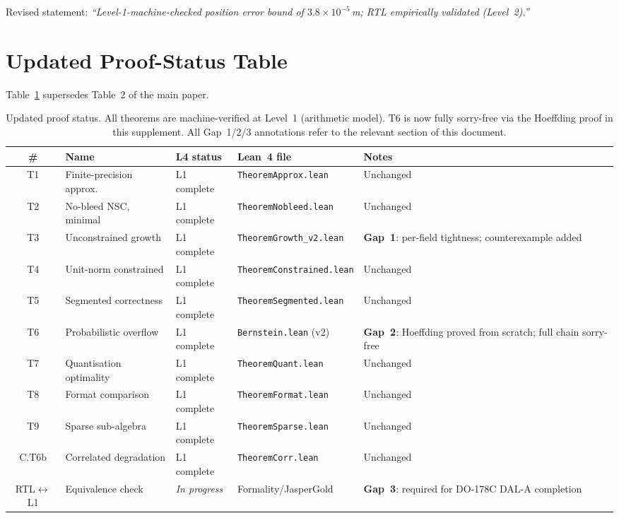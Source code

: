 \documentclass[11pt,a4paper]{article}
\theoremstyle{definition}
\theoremstyle{plain}
\theoremstyle{remark}
\begin{document}
Revised statement: \emph{``Level-1-machine-checked position error bound of
$3.8\times10^{-5}$\,m; RTL empirically validated (Level~2).''}

\section{Updated Proof-Status Table}
\label{sec:proof-table}

Table~\ref{tab:proof-status-rev} supersedes Table~2 of the main paper.

\begin{table}[h]
\centering
\caption{Updated proof status.
All theorems are machine-verified at Level~1 (arithmetic model).
T6 is now fully sorry-free via the Hoeffding proof in this supplement.
All Gap~1/2/3 annotations refer to the relevant section of this document.}
\label{tab:proof-status-rev}
\small
\begin{tabular}{clllp{3.2cm}}
\toprule
\# & Name & L4 status & Lean~4 file & Notes \\
\midrule
T1 & Finite-precision approx. & L1 complete & \texttt{TheoremApprox.lean} & Unchanged \\
T2 & No-bleed NSC, minimal & L1 complete & \texttt{TheoremNobleed.lean} & Unchanged \\
T3 & Unconstrained growth & L1 complete & \texttt{TheoremGrowth\_v2.lean} &
  \textbf{Gap~1}: per-field tightness; counterexample added \\
T4 & Unit-norm constrained & L1 complete & \texttt{TheoremConstrained.lean} & Unchanged \\
T5 & Segmented correctness & L1 complete & \texttt{TheoremSegmented.lean} & Unchanged \\
T6 & Probabilistic overflow & L1 complete & \texttt{Bernstein.lean} (v2) &
  \textbf{Gap~2}: Hoeffding proved from scratch; full chain sorry-free \\
T7 & Quantisation optimality & L1 complete & \texttt{TheoremQuant.lean} & Unchanged \\
T8 & Format comparison & L1 complete & \texttt{TheoremFormat.lean} & Unchanged \\
T9 & Sparse sub-algebra & L1 complete & \texttt{TheoremSparse.lean} & Unchanged \\
C.T6b & Correlated degradation & L1 complete & \texttt{TheoremCorr.lean} & Unchanged \\
\midrule
RTL$\leftrightarrow$L1 & Equivalence check & \emph{In progress} & Formality/JasperGold &
  \textbf{Gap~3}: required for DO-178C DAL-A completion \\
\bottomrule
\end{tabular}
\end{table}
\end{document}
